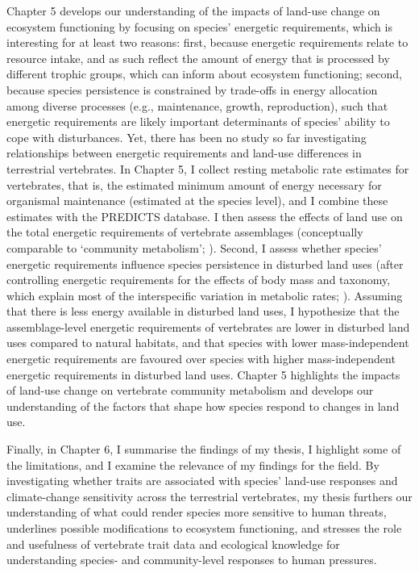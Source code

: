 Chapter 5 develops our understanding of the impacts of land-use change on ecosystem functioning by focusing on species' energetic requirements, which is interesting for at least two reasons: first, because energetic requirements relate to resource intake, and as such reflect the amount of energy that is processed by different trophic groups, which can inform about ecosystem functioning; second, because species persistence is constrained by trade-offs in energy allocation among diverse processes (e.g., maintenance, growth, reproduction), such that energetic requirements are likely important determinants of species' ability to cope with disturbances. Yet, there has been no study so far investigating relationships between energetic requirements and land-use differences in terrestrial vertebrates. In Chapter 5, I collect resting metabolic rate estimates for vertebrates, that is, the estimated minimum amount of energy necessary for organismal maintenance (estimated at the species level), and I combine these estimates with the PREDICTS database. I then assess the effects of land use on the total energetic requirements of vertebrate assemblages (conceptually comparable to `community metabolism'; \citet{Migne2015}). Second, I assess whether species' energetic requirements influence species persistence in disturbed land uses (after controlling energetic requirements for the effects of body mass and taxonomy, which explain most of the interspecific variation in metabolic rates; \citet{White2011}). Assuming that there is less energy available in disturbed land uses, I hypothesize that the assemblage-level energetic requirements of vertebrates are lower in disturbed land uses compared to natural habitats, and that species with lower mass-independent energetic requirements are favoured over species with higher mass-independent energetic requirements in disturbed land uses. Chapter 5 highlights the impacts of land-use change on vertebrate community metabolism and develops our understanding of the factors that shape how species respond to changes in land use.

Finally, in Chapter 6, I summarise the findings of my thesis, I highlight some of the limitations, and I examine the relevance of my findings for the field. By investigating whether traits are associated with species' land-use responses and climate-change sensitivity across the terrestrial vertebrates, my thesis furthers our understanding of what could render species more sensitive to human threats, underlines possible modifications to ecosystem functioning, and stresses the role and usefulness of vertebrate trait data and ecological knowledge for understanding species- and community-level responses to human pressures.

